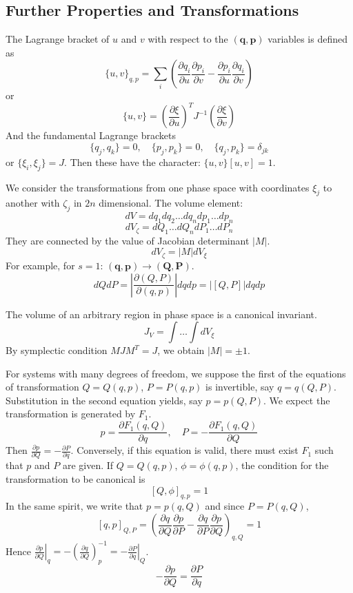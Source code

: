 \documentclass[12pt]{article}
\begin{document}
	\subsection*{Further Properties and Transformations}
	The Lagrange bracket of $u$ and $v$ with respect to the $(\mathbf{q}, \mathbf{p})$ variables is defined as
	\[ \{u,v\}_{q,p} = \sum_i \left( \frac{\partial q_i}{\partial u} \frac{\partial p_i}{\partial v} - \frac{\partial p_i}{\partial u} \frac{\partial q_i}{\partial v} \right) \]
	or
	\[ \{u,v\} = \left( \frac{\partial \xi}{\partial u} \right)^T J^{-1} \left( \frac{\partial \xi}{\partial v} \right) \]
	And the fundamental Lagrange brackets
	\[ \{q_j, q_k\} = 0, \quad \{p_j, p_k\} = 0, \quad \{q_j, p_k\} = \delta_{jk} \]
	or $\{ \xi_i, \xi_j \} = J$.
	Then these have the character: $\{u,v\}[u,v]=1$.
	
	We consider the transformations from one phase space with coordinates $\xi_j$ to another with $\zeta_j$ in $2n$ dimensional.
	The volume element:
	\[ dV = dq_1 dq_2 \dots dq_n dp_1 \dots dp_n \]
	\[ dV_\zeta = dQ_1 \dots dQ_n dP_1 \dots dP_n \]
	They are connected by the value of Jacobian determinant $|M|$.
	\[ dV_\zeta = |M| dV_\xi \]
	For example, for $s=1$: $(\mathbf{q}, \mathbf{p}) \to (\mathbf{Q}, \mathbf{P})$.
	\[ dQ dP = \left| \frac{\partial(Q,P)}{\partial(q,p)} \right| dq dp = |[Q,P]| dq dp \]
	
	The volume of an arbitrary region in phase space is a canonical invariant.
	\[ J_V = \int \dots \int dV_\xi \]
	By symplectic condition $MJM^T=J$, we obtain $|M| = \pm 1$.
	
	For systems with many degrees of freedom, we suppose the first of the equations of transformation $Q=Q(q,p)$, $P=P(q,p)$ is invertible, say $q = q(Q,P)$.
	Substitution in the second equation yields, say $p=p(Q,P)$.
	We expect the transformation is generated by $F_1$.
	\[ p = \frac{\partial F_1(q,Q)}{\partial q}, \quad P = -\frac{\partial F_1(q,Q)}{\partial Q} \]
	Then $\frac{\partial p}{\partial Q} = -\frac{\partial P}{\partial q}$.
	Conversely, if this equation is valid, there must exist $F_1$ such that $p$ and $P$ are given.
	If $Q=Q(q,p)$, $\phi = \phi(q,p)$, the condition for the transformation to be canonical is
	\[ [Q,\phi]_{q,p} = 1 \]
	In the same spirit, we write that $p=p(q,Q)$ and since $P=P(q,Q)$,
	\[ [q,p]_{Q,P} = \left(\frac{\partial q}{\partial Q}\frac{\partial p}{\partial P} - \frac{\partial q}{\partial P}\frac{\partial p}{\partial Q}\right)_{q,Q} = 1 \]
	Hence $\left. \frac{\partial p}{\partial Q} \right|_q = - \left( \frac{\partial q}{\partial Q} \right)_p^{-1} = -\left. \frac{\partial P}{\partial q} \right|_Q$.
	\[ -\frac{\partial p}{\partial Q} = \frac{\partial P}{\partial q} \]
\end{document}
